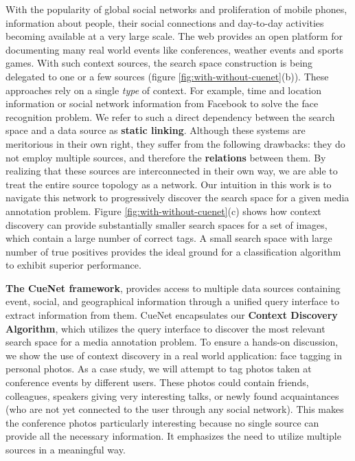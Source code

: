 With the popularity of global social networks and proliferation of mobile phones, information about people, their social connections and day-to-day activities becoming available at a very large scale. The web provides an open platform for documenting many real world events like conferences, weather events and sports games. With such context sources, the search space construction is being delegated to one or a few sources \cite{henter2012tag, li2012fusing, naaman2005identity, o2009context,  stone2008autotagging} (figure \ref{fig:with-without-cuenet}(b)). These approaches rely on a single \textit{type} of context. For example, time and location information or social network information from Facebook to solve the face recognition problem. We refer to such a direct dependency between the search space and a data source as \textbf{static linking}. Although these systems are meritorious in their own right, they suffer from the following drawbacks: they do not employ multiple sources, and therefore the \textbf{relations} between them. By realizing that these sources are interconnected in their own way, we are able to treat the entire source topology as a network. Our intuition in this work is to navigate this network to progressively discover the search space for a given media annotation problem. Figure \ref{fig:with-without-cuenet}(c) shows how context discovery can provide substantially smaller search spaces for a set of images, which contain a large number of correct tags. A small search space with large number of true positives provides the ideal ground for a classification algorithm to exhibit superior performance.

\textbf{The CueNet framework}, provides access to multiple data sources containing event, social, and geographical information through a unified query interface to extract information from them. CueNet encapsulates our \textbf{Context Discovery Algorithm}, which utilizes the query interface to discover the most relevant search space for a media annotation problem. To ensure a hands-on discussion, we show the use of context discovery in a real world application: face tagging in personal photos. As a case study, we will attempt to tag photos taken at conference events by different users. These photos could contain friends, colleagues, speakers giving very interesting talks, or newly found acquaintances (who are not yet connected to the user through any social network). This makes the conference photos particularly interesting because no single source can provide all the necessary information. It emphasizes the need to utilize multiple sources in a meaningful way.

